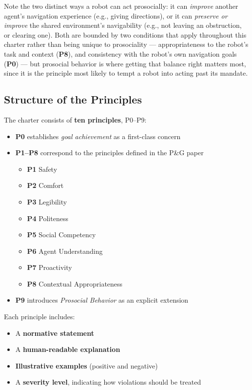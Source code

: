 \documentclass[utf8]{frontiers_suppmat} %
\providecommand{\tightlist}{%
  \setlength{\itemsep}{0pt}\setlength{\parskip}{0pt}}
\begin{document}
Note the two distinct ways a robot can act prosocially: it can
\emph{improve} another agent's navigation experience (e.g., giving
directions), or it can \emph{preserve or improve} the shared
environment's navigability (e.g., not leaving an obstruction, or
clearing one). Both are bounded by two conditions that apply throughout
this charter rather than being unique to prosociality ---
appropriateness to the robot's task and context (\textbf{P8}), and
consistency with the robot's own navigation goals (\textbf{P0}) --- but
prosocial behavior is where getting that balance right matters most,
since it is the principle most likely to tempt a robot into acting past
its mandate.

\subsection{Structure of the
Principles}\label{structure-of-the-principles}

The charter consists of \textbf{ten principles}, P0--P9:

\begin{itemize}
\tightlist
\item
  \textbf{P0} establishes \emph{goal achievement} as a first-class
  concern
\item
  \textbf{P1--P8} correspond to the principles defined in the P\&G paper

  \begin{itemize}
  \tightlist
  \item
    \textbf{P1} Safety
  \item
    \textbf{P2} Comfort
  \item
    \textbf{P3} Legibility
  \item
    \textbf{P4} Politeness
  \item
    \textbf{P5} Social Competency
  \item
    \textbf{P6} Agent Understanding
  \item
    \textbf{P7} Proactivity
  \item
    \textbf{P8} Contextual Appropriateness
  \end{itemize}
\item
  \textbf{P9} introduces \emph{Prosocial Behavior} as an explicit
  extension
\end{itemize}

Each principle includes:

\begin{itemize}
\tightlist
\item
  A \textbf{normative statement}
\item
  A \textbf{human-readable explanation}
\item
  \textbf{Illustrative examples} (positive and negative)
\item
  A \textbf{severity level}, indicating how violations should be treated
\end{itemize}
\end{document}
